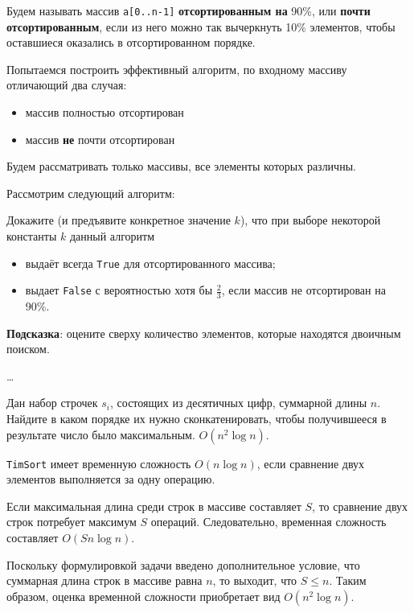 \begin{problem}
    Будем называть массив \texttt{a[0..n-1]} \textbf{отсортированным на} 90\%, или
    \textbf{почти отсортированным}, если из него можно так вычеркнуть 10\% элементов,
    чтобы оставшиеся оказались в отсортированном порядке.

    Попытаемся построить эффективный алгоритм, по входному массиву отличающий два случая:
    \begin{itemize}
    	\item массив полностью отсортирован
    	\item массив \textbf{не} почти отсортирован
    \end{itemize}

	Будем рассматривать только массивы, все элементы которых различны.

    Рассмотрим следующий алгоритм:
    \medskip\noindent
    {
        \normalfont
    }

    Докажите (и предъявите конкретное значение $k$), что при выборе некоторой
    константы $k$ данный алгоритм
    \begin{itemize}
      \item выдаёт всегда \texttt{True} для отсортированного массива;
      \item выдает \texttt{False} с вероятностью хотя бы $\frac{2}{3}$,
        если массив не отсортирован на 90\%.
    \end{itemize}

    {
        \footnotesize \textbf{Подсказка}: оцените сверху количество элементов,
        которые находятся двоичным поиском.
    }
\end{problem}

\begin{solution}
    \dots
\end{solution}


\begin{problem}
    Дан набор строчек $s_i$, состоящих из десятичных цифр, суммарной длины $n$.
    Найдите в каком порядке их нужно сконкатенировать, чтобы получившееся в результате
    число было максимальным. $O(n^2 \log{n})$.
\end{problem}

\begin{solution}
    \medskip\noindent
    

    \texttt{TimSort} имеет временную сложность $O(n \log{n})$, если сравнение двух элементов выполняется за одну
    операцию.

    Если максимальная длина среди строк в массиве составляет $S$, то сравнение двух строк потребует максимум $S$ операций.
    Следовательно, временная сложность составляет $O(Sn \log{n})$.

    Поскольку формулировкой задачи введено дополнительное условие, что суммарная длина строк в массиве равна $n$, то
    выходит, что $S \le n$. Таким образом, оценка временной сложности приобретает вид $O(n^2 \log{n})$.
\end{solution}


